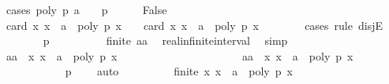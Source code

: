 \begin{isabellebody}
%
\isadelimproof
%
\endisadelimproof
%
\isatagproof
{}\isamarkupfalse%
\ {\isacharparenleft}cases\ {\isachardoublequoteopen}poly\ p\ a\ {\isacharequal}\ {}\ {\isasymand}\ p\ {\isasymnoteq}\ {}{\isachardoublequoteclose}{\isacharparenright}\isanewline
\ \ \isamarkupfalse%
\ False\isanewline
\ \ \ \ \isamarkupfalse%
\ {\isachardoublequoteopen}card\ {\isacharbraceleft}x{\isachardot}\ x\ {\isasymge}\ a\ {\isasymand}\ poly\ p\ x\ {\isacharequal}\ {}{\isacharbraceright}\ {\isacharequal}\ card\ {\isacharbraceleft}x{\isachardot}\ x\ {\isachargreater}\ a\ {\isasymand}\ poly\ p\ x\ {\isacharequal}\ {}{\isacharbraceright}{\isachardoublequoteclose}\isanewline
\ \ \ \ \isamarkupfalse%
\ {\isacharparenleft}cases\ rule{\isacharcolon}\ disjE{\isacharparenright}\isanewline
\ \ \ \ \ \ \isamarkupfalse%
\ {\isachardoublequoteopen}p\ {\isacharequal}\ {}{\isachardoublequoteclose}\isanewline
\ \ \ \ \ \ \isamarkupfalse%
\ {\isachardoublequoteopen}{\isasymnot}finite\ {\isacharbraceleft}a{\isacharless}{\isachardot}{\isachardot}{\isacharless}a{\isacharplus}{}{\isacharbraceright}{\isachardoublequoteclose}\ \isamarkupfalse%
\ real{\isacharunderscore}infinite{\isacharunderscore}interval\ \isamarkupfalse%
\ simp\isanewline
\ \ \ \ \ \ \isamarkupfalse%
\ \isamarkupfalse%
\ {\isachardoublequoteopen}{\isacharbraceleft}a{\isacharless}{\isachardot}{\isachardot}{\isacharless}a{\isacharplus}{}{\isacharbraceright}\ {\isasymsubseteq}\ {\isacharbraceleft}x{\isachardot}\ x\ {\isasymge}\ a\ {\isasymand}\ poly\ p\ x\ {\isacharequal}\ {}{\isacharbraceright}{\isachardoublequoteclose}\isanewline
\ \ \ \ \ \ \ \ \ \ \ \ \ \ \ \ \ \ \ \ {\isachardoublequoteopen}{\isacharbraceleft}a{\isacharless}{\isachardot}{\isachardot}{\isacharless}a{\isacharplus}{}{\isacharbraceright}\ {\isasymsubseteq}\ {\isacharbraceleft}x{\isachardot}\ x\ {\isachargreater}\ a\ {\isasymand}\ poly\ p\ x\ {\isacharequal}\ {}{\isacharbraceright}{\isachardoublequoteclose}\ \isanewline
\ \ \ \ \ \ \ \ \ \ \isamarkupfalse%
\ {\isacharbackquoteopen}p\ {\isacharequal}\ {}{\isacharbackquoteclose}\ \isamarkupfalse%
\ auto\isanewline
\ \ \ \ \ \ \isamarkupfalse%
\ \isamarkupfalse%
\ {\isachardoublequoteopen}{\isasymnot}finite\ {\isacharbraceleft}x{\isachardot}\ x\ {\isasymge}\ a\ {\isasymand}\ poly\ p\ x\ {\isacharequal}\ {}{\isacharbraceright}{\isachardoublequoteclose}\ \isanewline

\end{isabellebody}
